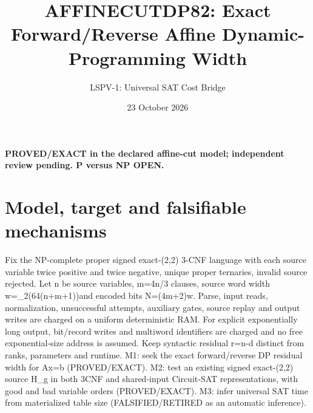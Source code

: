 \documentclass[11pt]{article}
\title{AFFINECUTDP82: Exact Forward/Reverse Affine Dynamic-Programming Width}
\author{LSPV-1: Universal SAT Cost Bridge}
\date{23 October 2026}
\begin{document}
\maketitle
\begin{center}\textbf{PROVED/EXACT in the declared affine-cut model; independent review pending. P versus NP OPEN.}\end{center}
\section{Model, target and falsifiable mechanisms}
Fix the NP-complete proper signed exact-(2,2) 3-CNF language with each source variable twice positive and twice negative, unique proper ternaries, invalid source rejected. Let n be source variables, m=4n/3 clauses, source word width w=\lceil\log_2(64(n+m+1))\rceil and encoded bits N=(4m+2)w. Parse, input reads, normalization, unsuccessful attempts, auxiliary gates, source replay and output writes are charged on a uniform deterministic RAM. For explicit exponentially long output, bit/record writes and multiword identifiers are charged and no free exponential-size address is assumed. Keep syntactic residual r=n-d distinct from ranks, parameters and runtime.
M1: seek the exact forward/reverse DP residual width for Ax=b (PROVED/EXACT).
M2: test an existing signed exact-(2,2) source H_g in both 3CNF and shared-input Circuit-SAT representations, with good and bad variable orders (PROVED/EXACT).
M3: infer universal SAT time from materialized table size (FALSIFIED/RETIRED as an automatic inference).
\end{document}
